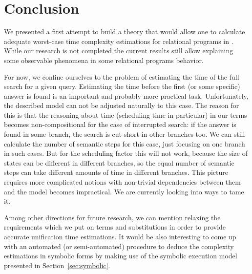 \section{Conclusion}

We presented a first attempt to build a theory that would allow one to calculate adequate worst-case time
complexity estimations for relational programs in \mK. While our research is not completed the current results still
allow explaining some observable phenomena in some relational programs behavior.

For now, we confine ourselves to the problem of estimating the time of the full search for a given query. Estimating the time before the first (or some specific) answer is found is an important and probably more practical task. Unfortunately, the described model can not be adjusted naturally to this case. The reason for this is that the reasoning about time (scheduling time in particular) in our terms becomes non-compositional for the case of interrupted search: if the answer is found in some branch, the search is cut short in other branches too. We can still calculate the number of semantic steps for this case, just focusing on one branch in such cases. But for the scheduling factor this will not work, because the size of states can be different in different branches, so the equal number of semantic steps can take different amounts of time in different branches. This picture requires more complicated notions with non-trivial dependencies between them and the model becomes impractical. We are currently looking into ways to tame it.

Among other directions for future research, we can mention relaxing the requirements which we put on
terms and substitutions in order to provide accurate unification time estimations. It would be also
interesting to come up with an automated (or semi-automated) procedure to deduce the complexity
estimations in symbolic forms by making use of the symbolic execution model presented in Section~\ref{sec:symbolic}.
